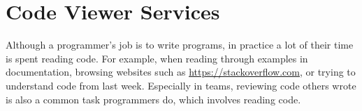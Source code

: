 
\chapter{Code Viewer Services}
\label{chap:code-viewer-services}

Although a programmer's job is to write programs, in practice a lot of their time is spent reading code.
For example, when reading through examples in documentation, browsing websites such as \url{https://stackoverflow.com},
or trying to understand code from last week.
Especially in teams, reviewing code others wrote is also a common task programmers do, which involves reading code.




